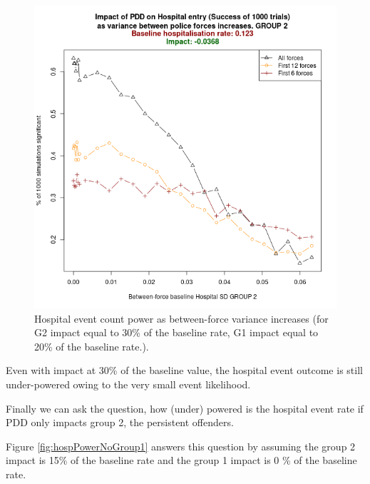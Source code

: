 \documentclass[
]{article}
\begin{document}
\begin{figure}

{\centering \includegraphics[width=0.8\linewidth]{figures/hospital_vs_pf_2x_g2} 

}

\caption{Hospital event count power as between-force variance increases (for G2 impact equal to 30\% of the baseline rate, G1 impact equal to 20\% of the baseline rate.).}\label{fig:hospPower2X}
\end{figure}

Even with impact at 30\% of the baseline value, the hospital event outcome is still under-powered owing to the very small event likelihood.

Finally we can ask the question, how (under) powered is the hospital event rate if PDD only impacts group 2, the persistent offenders.

Figure \ref{fig:hospPowerNoGroup1} answers this question by assuming the group 2 impact is 15\% of the baseline rate and the group 1 impact is 0 \% of the baseline rate.
\end{document}

